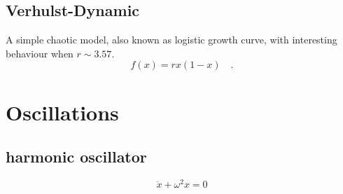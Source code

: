 \subsection{Verhulst-Dynamic}
A simple chaotic model, also known as logistic growth curve, with interesting behaviour 
when $r \sim 3.57$.
\begin{equation}
f(x) = rx(1-x) \quad .
\end{equation}

\section{Oscillations}
\subsection{harmonic oscillator}
\begin{equation}
\ddot{x} + \omega^2 x = 0
\end{equation}



